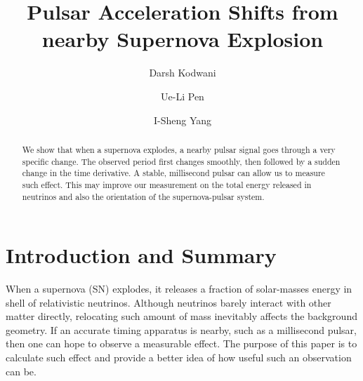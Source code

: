 \documentclass[aps,showpacs,onecolumn,floats,prd,superscriptaddress,nofootinbib]{revtex4}
\begin{document}
\title{Pulsar Acceleration Shifts from nearby Supernova Explosion}

\author{Darsh Kodwani}

\author{Ue-Li Pen}

\author{I-Sheng Yang}

\begin{abstract}
We show that when a supernova explodes, a nearby pulsar signal goes through a very specific change. The observed period first changes smoothly, then followed by a sudden change in the time derivative. A stable, millisecond pulsar can allow us to measure such effect. This may improve our measurement on the total energy released in neutrinos and also the orientation of the supernova-pulsar system. 
\end{abstract}

\maketitle

\section{Introduction and Summary}

When a supernova (SN) explodes, it releases a fraction of solar-masses energy in shell of relativistic neutrinos. Although neutrinos barely interact with other matter directly, relocating such amount of mass inevitably affects the background geometry. If an accurate timing apparatus is nearby, such as a millisecond pulsar, then one can hope to observe a measurable effect. The purpose of this paper is to calculate such effect and provide a better idea of how useful such an observation can be.
\end{document}
